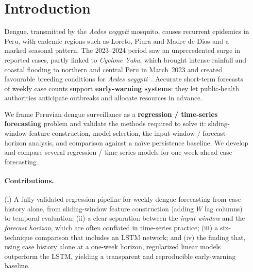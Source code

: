 \documentclass[runningheads]{llncs}
\begin{document}
\section{Introduction}
Dengue, transmitted by the \emph{Aedes aegypti} mosquito, causes recurrent epidemics in
Peru, with endemic regions such as Loreto, Piura and Madre de Dios and a marked seasonal
pattern. The 2023--2024 period saw an unprecedented surge in reported cases, partly linked
to \emph{Cyclone Yaku}, which brought intense rainfall and coastal flooding to northern and
central Peru in March~2023 and created favourable breeding conditions for \emph{Aedes
aegypti}~\cite{yaku2023}. Accurate short-term forecasts of weekly case counts support
\textbf{early-warning systems}: they let public-health authorities anticipate outbreaks
and allocate resources in advance.

We frame Peruvian dengue surveillance as a \textbf{regression / time-series forecasting}
problem and validate the methods required to solve it: sliding-window feature construction,
model selection, the input-window / forecast-horizon analysis, and comparison against a
na\"ive persistence baseline. We develop and compare several regression / time-series
models for one-week-ahead case forecasting.

\paragraph{Contributions.}
(i) A fully validated regression pipeline for weekly dengue forecasting from case history
alone, from sliding-window feature construction (adding $W$ lag columns) to temporal
evaluation;
(ii) a clear separation between the \emph{input window} and the \emph{forecast horizon},
which are often conflated in time-series practice;
(iii) a six-technique comparison that includes an LSTM network; and
(iv) the finding that, using case history alone at a one-week horizon, regularized linear
models outperform the LSTM, yielding a transparent and reproducible early-warning baseline.

\end{document}
